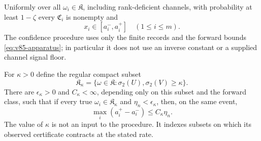 \begin{theorem}\label{thm:v85-confidence}
Uniformly over all $\omega_i\in\mathfrak K$, including rank-deficient
channels, with probability at least $1-\zeta$ every
$\mathfrak C_i$ is nonempty and
\begin{equation}\label{eq:v85-coverage}
                         x_i\in[a_i^-,a_i^+]
                              \quad(1\le i\le m).
\end{equation}
The confidence procedure uses only the finite records and the forward
bounds \eqref{eq:v85-apparatus}; in particular it does not use an
inverse constant or a supplied channel signal floor.

For $\kappa>0$ define the regular compact subset
\begin{equation}\label{eq:v85-regular-class}
 \mathfrak K_\kappa=\{\omega\in\mathfrak K:
                  \sigma_2(U),\sigma_2(V)\ge\kappa\}.
\end{equation}
There are $\epsilon_\kappa>0$ and $C_\kappa<\infty$, depending only
on this subset and the forward class, such that if every true
$\omega_i\in\mathfrak K_\kappa$ and $\eta_n<\epsilon_\kappa$, then,
on the same event,
\begin{equation}\label{eq:v85-contraction}
              \max_i(a_i^+-a_i^-)\le C_\kappa\eta_n.
\end{equation}
The value of $\kappa$ is not an input to the procedure. It indexes
subsets on which its observed certificate contracts at the stated rate.
\end{theorem}
